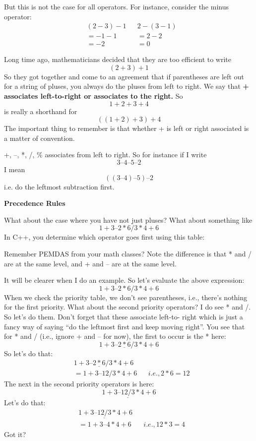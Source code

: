But this is not the case for all operators. For instance, consider the minus
operator:
\begin{align*}
&(2 - 3) - 1 & & 2 - (3 - 1)\\
&=-1 - 1 & & =2-2\\
&=-2 & & =0
\end{align*}

Long time ago, mathematicians decided that they are too efficient to write
\[(2 + 3) + 1\]
So they got together and come to an agreement that if parentheses are
left out for a string of pluses, you always do the pluses from left to right.
We say that \textbf{{+ associates left-to-right or associates to the right.}} So
\[1+2+3+4\]
is really a shorthand for
\[((1 + 2) + 3) + 4\]
The important thing to remember is that whether + is left or right
associated is a matter of convention.

+, –, *, /, \% associates from left to right. So for instance if I write
\[3–4–5–2\]
I mean
\[((3 – 4) – 5) – 2\]
i.e. do the leftmost subtraction first.


\textbf{{Precedence Rules}}

What about the case where you have not just pluses? What about
something like
\[1+3–2*6/3*4+6\]
In C++, you determine which operator goes first using this table:

\noindent{}

Remember PEMDAS from your math classes? Note the difference is that
* and / are at the same level, and + and – are at the same level.

%

It will be clearer when I do an example. So let's evaluate the above
expression:
\[1+3–2*6/3*4+6\]
When we check the priority table, we don't see parentheses, i.e., there's
nothing for the first priority. What about the second priority operators? I
do see * and /. So let's do them. Don't forget that these associate left-to-
right which is just a fancy way of saying “do the leftmost first and keep
moving right”. You see that for * and / (i.e., ignore + and – for now), the
first to occur is the * here:
\[1+3–\underline{2*6}/ 3*4+6\]
So let's do that:
\begin{align*}
  &1+3–\underline{2*6}/ 3*4+6\\
  &= 1 + 3 – 12 / 3 * 4 + 6 & &i.e., 2 * 6 = 12
\end{align*}
The next in the second priority operators is here:
\[1 + 3 – \underline{12 / 3} * 4 + 6\]
Let's do that:
\begin{align*}
  &1 + 3 – \underline{12 / 3} * 4 + 6\\
  &=1+3–4*4+6 & &i.e., 12 * 3 = 4
\end{align*}
Got it?

